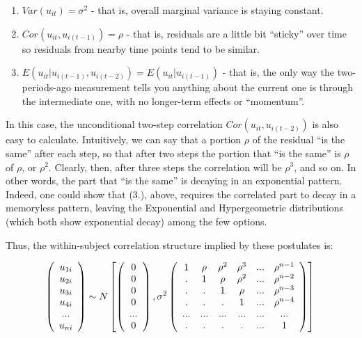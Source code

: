 \documentclass[
  letterpaper,
  DIV=11,
  numbers=noendperiod]{scrreprt}
\providecommand{\tightlist}{%
  \setlength{\itemsep}{0pt}\setlength{\parskip}{0pt}}\usepackage{longtable,booktabs,array}
\begin{document}
\begin{enumerate}
\def\labelenumi{\arabic{enumi}.}
\tightlist
\item
  \(Var(u_{it}) = \sigma^2\) - that is, overall marginal variance is
  staying constant.
\item
  \(Cor(u_{it},u_{i(t-1)}) = \rho\) - that is, residuals are a little
  bit ``sticky'' over time so residuals from nearby time points tend to
  be similar.
\item
  \(E(u_{it}|u_{i(t-1)},u_{i(t-2)}) = E(u_{it}|u_{i(t-1)})\) - that is,
  the only way the two-periods-ago measurement tells you anything about
  the current one is through the intermediate one, with no longer-term
  effects or ``momentum''.
\end{enumerate}

In this case, the unconditional two-step correlation
\(Cor(u_{it},u_{i(t-2)})\) is also easy to calculate. Intuitively, we
can say that a portion \(\rho\) of the residual ``is the same'' after
each step, so that after two steps the portion that ``is the same'' is
\(\rho\) of \(\rho\), or \(\rho^2\). Clearly, then, after three steps
the correlation will be \(\rho^3\), and so on. In other words, the part
that ``is the same'' is decaying in an exponential pattern. Indeed, one
could show that (3.), above, requires the correlated part to decay in a
memoryless pattern, leaving the Exponential and Hypergeometric
distributions (which both show exponential decay) among the few options.

Thus, the within-subject correlation structure implied by these
postulates is:

\[\left(\begin{array}{c}
u_{1i}\\
u_{2i}\\
u_{3i}\\
u_{4i}\\
...\\
u_{ni}
\end{array}\right)\sim N\left[\left(\begin{array}{c}
0\\
0\\
0\\
0\\
...\\
0
\end{array}\right),\sigma^2\left(\begin{array}{cccccc}
1 & \rho  & \rho^2 & \rho^3 & ... & \rho^{n-1}\\
. & 1 & \rho & \rho^2 & ... & \rho^{n-2}\\
. & . & 1& \rho  & ... & \rho^{n-3}\\
. & . & . & 1 & ... & \rho^{n-4} \\
... & ... & ... & ... & ... & ... \\
. & . & . & . & ... & 1
\end{array}\right)\right]\\\]
\end{document}
